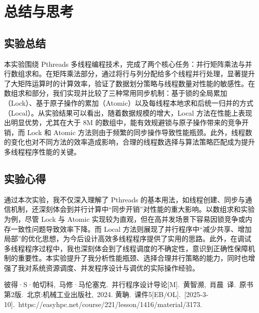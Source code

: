 \documentclass[a4paper, utf8]{ctexart}
\begin{document}
	\section{总结与思考}
	
	\subsection{实验总结}
	
	本实验围绕 Pthreads 多线程编程技术，完成了两个核心任务：并行矩阵乘法与并行数组求和。在矩阵乘法部分，通过将行与列分配给多个线程并行处理，显著提升了大矩阵运算时的计算效率，验证了数据划分策略与线程数量对性能的敏感性。在数组求和部分，我们实现并比较了三种常用同步机制：基于锁的全局累加（Lock）、基于原子操作的累加（Atomic）以及每线程本地求和后统一归并的方式（Local）。从实验结果可以看出，随着数据规模的增大，Local 方法在性能上表现出明显优势，尤其在大于 8M 的数组中，能有效规避锁与原子操作带来的竞争开销，而 Lock 和 Atomic 方法则由于频繁的同步操作导致性能瓶颈。此外，线程数的变化也对不同方法的效率造成影响，合理的线程数选择与算法策略匹配成为提升多线程程序性能的关键。
	
	\subsection{实验心得}
	
	通过本次实验，我不仅深入理解了 Pthreads 的基本用法，如线程创建、同步与通信机制，还深刻体会到并行计算中“同步开销”对性能的重大影响。以数组求和实验为例，尽管 Lock 与 Atomic 实现较为直观，但在高并发场景下容易因锁竞争或内存一致性问题导致效率下降。而 Local 方法则展现了并行程序中“减少共享、增加局部”的优化思想，为今后设计高效多线程程序提供了实用的思路。此外，在调试多线程程序过程中，我也深刻体会到了线程调度的不确定性，意识到正确性保障机制的重要性。本实验提升了我分析性能瓶颈、选择合理并行策略的能力，同时也增强了我对系统资源调度、并发程序设计与调优的实际操作经验。
	
	\let\cleardoublepage\clearpage
	
	\begin{thebibliography}{99}  
		 彼得·S·帕切科,\ 马修·马伦塞克.\ 并行程序设计导论[M].\ 黄智濒,\ 肖晨\ 译.\ 原书第2版.\ 北京:机械工业出版社,\ 2024.
		 黄聃.\ 课件5[EB/OL].\ [2025-3-10].\ https://easyhpc.net/course/221/lesson/1416/material/3173.
	\end{thebibliography}
	
\end{document}
